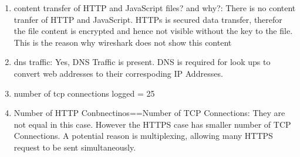 \documentclass[12pt]{article}
\begin{document}
\begin{enumerate}
\begin{enumerate}
        \item content transfer of HTTP and JavaScript files? and why?: There is no content tranfer of HTTP and JavaScript. HTTPs is secured data transfer, therefor the file content is encrypted and hence not visible without the key to the file. This is the reason why wireshark does not show this content
        \item dns traffic: Yes, DNS Traffic is present. DNS is required for look ups to convert web addresses to their correspoding IP Addresses.
        \item number of tcp connections logged = 25
        \item Number of HTTP Conbnectinos==Number of TCP Connections: They are not equal in this case. However the HTTPS case has smaller number of TCP Connections. A potential reason is multiplexing, allowing many HTTPS request to be sent simultaneously.
    \end{enumerate}
\end{enumerate}
\end{document}

